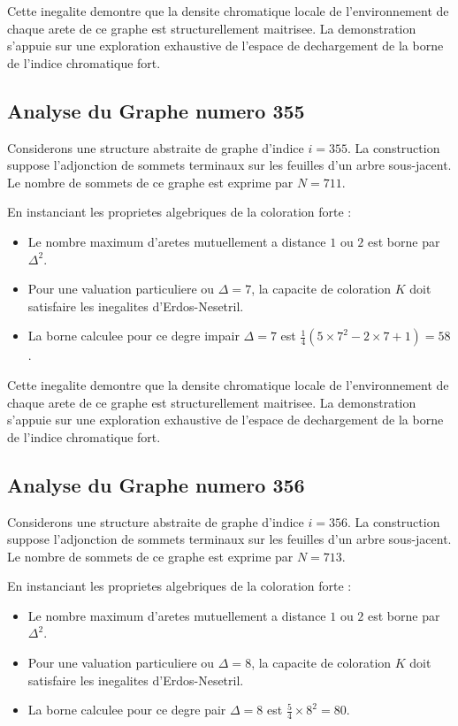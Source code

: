 \documentclass[11pt,a4paper]{article}
\begin{document}
Cette inegalite demontre que la densite chromatique locale de l'environnement de chaque arete de ce graphe est structurellement maitrisee. La demonstration s'appuie sur une exploration exhaustive de l'espace de dechargement de la borne de l'indice chromatique fort.

\subsection{Analyse du Graphe numero 355}
Considerons une structure abstraite de graphe d'indice $i = 355$. La construction suppose l'adjonction de sommets terminaux sur les feuilles d'un arbre sous-jacent. Le nombre de sommets de ce graphe est exprime par $N = 711$.

En instanciant les proprietes algebriques de la coloration forte :
\begin{itemize}
\item Le nombre maximum d'aretes mutuellement a distance $1$ ou $2$ est borne par $\Delta^2$.
\item Pour une valuation particuliere ou $\Delta = 7$, la capacite de coloration $K$ doit satisfaire les inegalites d'Erdos-Nesetril.
\item La borne calculee pour ce degre impair $\Delta = 7$ est $\frac{1}{4}(5 \times 7^2 - 2 \times 7 + 1) = 58$.
\end{itemize}

Cette inegalite demontre que la densite chromatique locale de l'environnement de chaque arete de ce graphe est structurellement maitrisee. La demonstration s'appuie sur une exploration exhaustive de l'espace de dechargement de la borne de l'indice chromatique fort.

\subsection{Analyse du Graphe numero 356}
Considerons une structure abstraite de graphe d'indice $i = 356$. La construction suppose l'adjonction de sommets terminaux sur les feuilles d'un arbre sous-jacent. Le nombre de sommets de ce graphe est exprime par $N = 713$.

En instanciant les proprietes algebriques de la coloration forte :
\begin{itemize}
\item Le nombre maximum d'aretes mutuellement a distance $1$ ou $2$ est borne par $\Delta^2$.
\item Pour une valuation particuliere ou $\Delta = 8$, la capacite de coloration $K$ doit satisfaire les inegalites d'Erdos-Nesetril.
\item La borne calculee pour ce degre pair $\Delta = 8$ est $\frac{5}{4} \times 8^2 = 80$.
\end{itemize}
\end{document}
